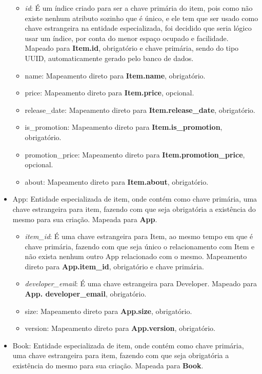 \documentclass[a4paper, 11pt]{article}
\begin{document}
\begin{itemize}
    \begin{itemize}
        \item {\textit{id}}: É um índice criado para ser a chave primária do item, pois como não existe nenhum atributo sozinho que é único, e ele tem que ser usado como chave estrangeira na entidade especializada, foi decidido que seria lógico usar um índice, por conta do menor espaço ocupado e facilidade. Mapeado para  {\textbf{Item.id}}, obrigatório e chave primária, sendo do tipo UUID, automaticamente gerado pelo banco de dados.
        \item name: Mapeamento direto para {\textbf{Item.name}}, obrigatório.
        \item price: Mapeamento direto para {\textbf{Item.price}}, opcional.
        \item release\_date: Mapeamento direto para {\textbf{Item.release\_date}}, obrigatório.
        \item is\_promotion: Mapeamento direto para {\textbf{Item.is\_promotion}}, obrigatório.
        \item promotion\_price: Mapeamento direto para {\textbf{Item.promotion\_price}}, opcional.
        \item about: Mapeamento direto para {\textbf{Item.about}}, obrigatório.
    \end{itemize}
    \item App: Entidade especializada de item, onde contém como chave primária, uma chave estrangeira para item, fazendo com que seja obrigatória a existência do mesmo para sua criação. Mapeada para {\textbf{App}}.
    \begin{itemize}
        \item {\textit{item\_id}}: É uma chave estrangeira para Item, ao mesmo tempo em que é chave primária, fazendo com que seja único o relacionamento com Item e não exista nenhum outro App relacionado com o mesmo. Mapeamento direto para {\textbf{App.item\_id}}, obrigatório e chave primária.
        \item {\textit{developer\_email}}: É uma chave estrangeira para Developer. Mapeado para {\textbf{App. developer\_email}}, obrigatório.
        \item size: Mapeamento direto para {\textbf{App.size}}, obrigatório.
        \item version: Mapeamento direto para {\textbf{App.version}}, obrigatório.
    \end{itemize}
    \item Book: Entidade especializada de item, onde contém como chave primária, uma chave estrangeira para item, fazendo com que seja obrigatória a existência do mesmo para sua criação. Mapeada para {\textbf{Book}}.

\end{itemize}
\end{document}
